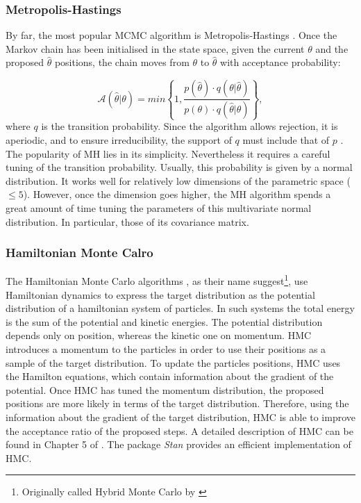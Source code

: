 \subsubsection{Metropolis-Hastings}
By far, the most popular MCMC algorithm is Metropolis-Hastings \citep{Metropolis1953,Hastings1970}. Once the Markov chain has been initialised in the state space, given the current $\theta$ and the proposed $\hat{\theta}$ positions, the chain moves from $\theta$ to $\hat{\theta}$ with acceptance probability:

\begin{equation}
\mathcal{A}(\hat{\theta}|\theta)=min\left\{1,\frac{p(\hat{\theta})\cdot q(\theta|\hat{\theta})}{p(\theta)\cdot q(\hat{\theta}|\theta)}\right\},
\end{equation}
where $q$ is the transition probability. Since the algorithm allows rejection, it is aperiodic, and to ensure irreducibility, the support of $q$ must include that of $p$ \citep{Andrieu2003}. The popularity of MH lies in its simplicity. Nevertheless it requires a careful tuning of the transition probability. Usually, this probability is given by a normal distribution. It works well for relatively low dimensions of the parametric space ($\leq 5$). However, once the dimension goes higher, the MH algorithm spends a great amount of time tuning the parameters of this multivariate normal distribution. In particular, those of its covariance matrix.

\subsubsection{Hamiltonian Monte Calro}
The Hamiltonian Monte Carlo algorithms \citep{Duane1987,Neal1996}, as their name suggest\footnote{Originally called Hybrid Monte Carlo by \citep{Duane1987}}, use Hamiltonian dynamics to express the target distribution as the potential distribution of a hamiltonian system of particles. In such systems the total energy is the sum of the potential and kinetic energies. The potential distribution depends only on position, whereas the kinetic one on momentum. HMC introduces a momentum to the particles in order to use their positions as a sample of the target distribution. To update the particles positions, HMC uses the Hamilton equations, which contain information about the gradient of the potential. Once HMC has tuned the momentum distribution, the proposed positions are more likely in terms of the target distribution. Therefore, using the information about the gradient of the target distribution, HMC is able to improve the acceptance ratio of the proposed steps. A detailed description of HMC can be found in Chapter 5 of \citet{Brooks2011}. The package \emph{Stan} \citep{Stan} provides an efficient implementation of HMC.

